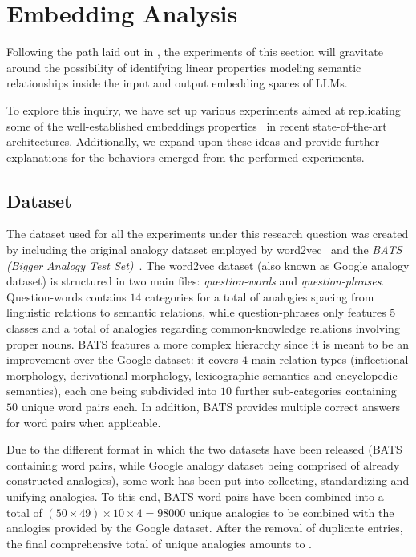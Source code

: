 \section{Embedding Analysis}

Following the path laid out in , the experiments of this section will gravitate around the possibility of identifying linear properties modeling semantic relationships inside the input and output embedding spaces of LLMs.

To explore this inquiry, we have set up various experiments aimed at replicating some of the well-established embeddings properties~\cite{mikolov2013} in recent state-of-the-art architectures.
Additionally, we expand upon these ideas and provide further explanations for the behaviors emerged from the performed experiments.

\subsection{Dataset}

The dataset used for all the experiments under this research question was created by including the original analogy dataset employed by word2vec~\cite{mikolov2013} and the \textit{BATS (Bigger Analogy Test Set)}~\cite{drozd2016}.
The word2vec dataset (also known as Google analogy dataset) is structured in two main files: \textit{question-words} and \textit{question-phrases}.
Question-words contains $14$ categories for a total of  analogies spacing from linguistic relations to semantic relations, while question-phrases only features $5$ classes and a total of  analogies regarding common-knowledge relations involving proper nouns.
BATS features a more complex hierarchy since it is meant to be an improvement over the Google dataset: it covers $4$ main relation types (inflectional morphology, derivational morphology, lexicographic semantics and encyclopedic semantics), each one being subdivided into $10$ further sub-categories containing $50$ unique word pairs each.
In addition, BATS provides multiple correct answers for word pairs when applicable. 

Due to the different format in which the two datasets have been released (BATS containing word pairs, while Google analogy dataset being comprised of already constructed analogies), some work has been put into collecting, standardizing and unifying analogies.
To this end, BATS word pairs have been combined into a total of $(50 \times 49) \times 10 \times 4 = 98000$ unique analogies to be combined with the  analogies provided by the Google dataset.
After the removal of duplicate entries, the final comprehensive total of unique analogies amounts to .

